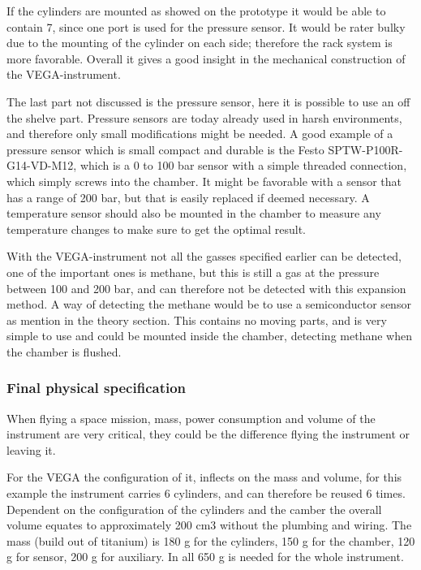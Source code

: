 If the cylinders are mounted as showed on the prototype it would be able to contain 7, since one port is used for the pressure sensor. It would be rater bulky due to the mounting of the cylinder on each side; therefore the rack system is more favorable. Overall it gives a good insight in the mechanical construction of the VEGA-instrument.

The last part not discussed is the pressure sensor, here it is possible to use an off the shelve part. Pressure sensors are today already used in harsh environments, and therefore only small modifications might be needed. A good example of a pressure sensor which is small compact and durable is the Festo SPTW-P100R-G14-VD-M12, which is a 0 to 100 bar sensor with a simple threaded connection, which simply screws into the chamber. It might be favorable with a sensor that has a range of 200 bar, but that is easily replaced if deemed necessary. A temperature sensor should also be mounted in the chamber to measure any temperature changes to make sure to get the optimal result.

With the VEGA-instrument not all the gasses specified earlier can be detected, one of the important ones is methane, but this is still a gas at the pressure between 100 and 200 bar, and can therefore not be detected with this expansion method. A way of detecting the methane would be to use a semiconductor sensor as mention in the theory section. This contains no moving parts, and is very simple to use and could be mounted inside the chamber, detecting methane when the chamber is flushed.

\subsubsection{Final physical specification}

When flying a space mission, mass, power consumption and volume of the instrument are very critical, they could be the difference flying the instrument or leaving it.

For the VEGA the configuration of it, inflects on the mass and volume, for this example the instrument carries 6 cylinders, and can therefore be reused 6 times. Dependent on the configuration of the cylinders and the camber the overall volume equates to approximately 200 cm3 without the plumbing and wiring. The mass (build out of titanium) is 180 g for the cylinders, 150 g for the chamber, 120 g for sensor, 200 g for auxiliary. In all 650 g is needed for the whole instrument.

